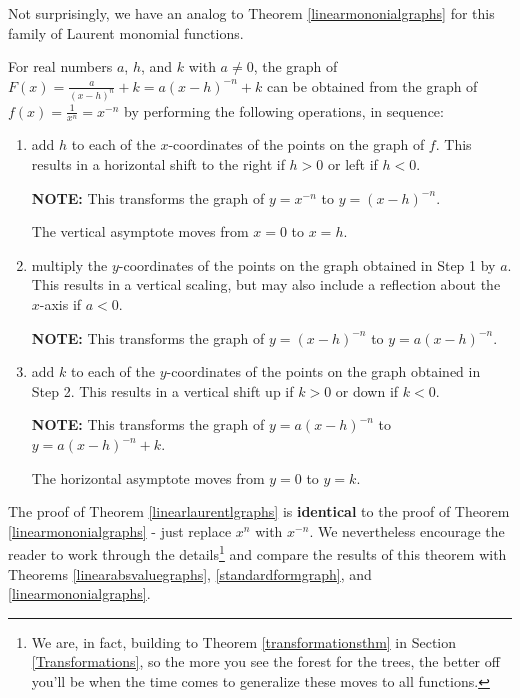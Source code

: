 Not surprisingly, we have an analog to Theorem \ref{linearmononialgraphs} for this family of Laurent monomial functions.

\colorbox{ResultColor}{\bbm

\begin{thm} \label{linearlaurentlgraphs}  For real numbers $a$, $h$, and $k$ with $a \neq 0$, the graph of $F(x) = \frac{a}{(x-h)^n}+k =  a(x-h)^{-n}+k$  can be obtained from the graph of $f(x) = \frac{1}{x^n}= x^{-n}$ by performing the following operations, in sequence:

\begin{enumerate}

\item  add $h$ to each of the $x$-coordinates of the points on the graph of $f$.  This results in a horizontal shift to the right if $h > 0$ or left if $h < 0$.

\textbf{NOTE:}  This transforms the graph of $y = x^{-n}$ to $y = (x-h)^{-n}$.   

The vertical asymptote moves from $x=0$ to $x=h$.

\item  multiply the $y$-coordinates of the points on the graph obtained in Step 1 by $a$.   This results in a vertical scaling, but may also include a reflection about the $x$-axis if $a < 0$.

\textbf{NOTE:}  This transforms the graph of $y = (x-h)^{-n}$ to $y = a(x-h)^{-n}$.

\item  add $k$ to each of the $y$-coordinates of the points on the graph obtained in Step 2.  This results in a vertical shift up if $k > 0$ or down if $k< 0$.

\textbf{NOTE:}  This transforms the graph of  $y = a(x-h)^{-n}$ to $y = a(x-h)^{-n}+k$.

The  horizontal asymptote moves from $y=0$ to $y=k$.

\end{enumerate}

\end{thm}

\ebm}


The proof of Theorem \ref{linearlaurentlgraphs} is \textbf{identical} to the proof of Theorem \ref{linearmononialgraphs} - just replace $x^n$ with $x^{-n}$.  We nevertheless encourage the reader to work through the details\footnote{We are, in fact, building to Theorem \ref{transformationsthm} in Section \ref{Transformations}, so the more you see the forest for the trees, the better off you'll be when the time comes to generalize these moves to all functions.} and compare the results of this theorem with Theorems \ref{linearabsvaluegraphs}, \ref{standardformgraph}, and  \ref{linearmononialgraphs}.


